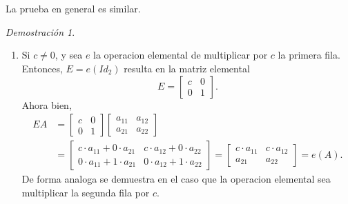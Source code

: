\documentclass{article}
\theoremstyle{definition}
\theoremstyle{definition}
\theoremstyle{remark}
\newtheorem*{demo}{Demostración}
\begin{document}
\\\\La prueba en general es similar.\\ \begin{demo}\;

  \begin{enumerate}[label=\textcolor{azulp2}{E\arabic*.}]
  \item  Si $c\neq 0$, y sea $e$ la operacion elemental de multiplicar por $c$ la primera fila. Entonces, $E=e(Id_2)$ resulta en la matriz elemental \[
    E=\begin{bmatrix}c & 0 \\ 0 & 1 \end{bmatrix}.
  \]Ahora bien,\[
  \begin{aligned}
    EA&=\begin{bmatrix}c & 0 \\ 0 & 1 \end{bmatrix} \begin{bmatrix} a_{11} & a_{12} \\ a_{21} & a_{22} \end{bmatrix} \\ 
      &= \begin{bmatrix} c \cdot a_{11} + 0 \cdot a_{21} & c \cdot a_{12} + 0 \cdot a_{22} \\ 0 \cdot a_{11}+ 1 \cdot a_{21} & 0 \cdot a_{12} + 1 \cdot a_{22} \end{bmatrix}
      = \begin{bmatrix} c\cdot a_{11} & c \cdot a_{12} \\ a_{21} & a_{22} \end{bmatrix} = e(A).
  \end{aligned}
  \]
  De forma analoga se demuestra en el caso que la operacion elemental sea multiplicar la segunda fila por $c$. \pagebreak


\end{enumerate}
\end{demo}
\end{document}
